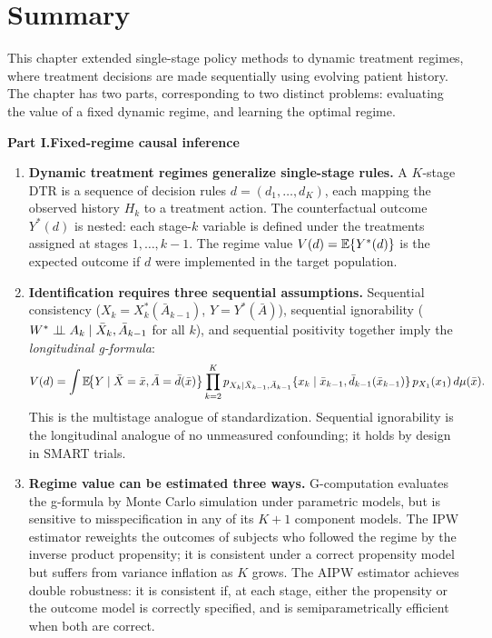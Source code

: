 \documentclass[master.tex]{subfiles}
\begin{document}
\section{Summary}
\label{w15:sec:summary}

This chapter extended single-stage policy methods to dynamic treatment regimes, where treatment decisions are made sequentially using evolving patient history. The chapter has two parts, corresponding to two distinct problems: evaluating the value of a fixed dynamic regime, and learning the optimal regime.

\medskip
\noindent\textbf{Part I.\enspace Fixed-regime causal inference}
\medskip

\begin{enumerate}

  \item \textbf{Dynamic treatment regimes generalize single-stage rules.}
    A $K$-stage DTR is a sequence of decision rules
    $d = (d_1,\ldots,d_K)$, each mapping the observed history $H_k$ to a
    treatment action. The counterfactual outcome $Y^*(d)$ is nested: each
    stage-$k$ variable is defined under the treatments assigned at stages
    $1,\ldots,k-1$. The regime value $V(d) = \mathbb{E}\{Y^*(d)\}$ is the
    expected outcome if $d$ were implemented in the target population.

  \item \textbf{Identification requires three sequential assumptions.}
    Sequential consistency ($X_k = X_k^*(\bar{A}_{k-1})$, $Y = Y^*(\bar{A})$),
    sequential ignorability ($W^* \perp\!\!\!\perp A_k \mid \bar{X}_k, \bar{A}_{k-1}$
    for all $k$), and sequential positivity together imply the
    \emph{longitudinal g-formula}:
    \[
      V(d) = \int \mathbb{E}\!\bigl\{Y \mid \bar{X}=\bar{x}, \bar{A}=\bar{d}(\bar{x})\bigr\}
             \prod_{k=2}^K p_{X_k\mid\bar{X}_{k-1},\bar{A}_{k-1}}
             \{x_k \mid \bar{x}_{k-1}, \bar{d}_{k-1}(\bar{x}_{k-1})\}\,
             p_{X_1}(x_1)\,d\mu(\bar{x}).
    \]
    This is the multistage analogue of standardization.
    Sequential ignorability is the longitudinal analogue of no unmeasured
    confounding; it holds by design in SMART trials.

  \item \textbf{Regime value can be estimated three ways.}
    G-computation evaluates the g-formula by Monte Carlo simulation under
    parametric models, but is sensitive to misspecification in any of its
    $K+1$ component models.  The IPW estimator reweights the outcomes of
    subjects who followed the regime by the inverse product propensity; it
    is consistent under a correct propensity model but suffers from
    variance inflation as $K$ grows.  The AIPW estimator achieves double
    robustness: it is consistent if, at each stage, either the propensity
    or the outcome model is correctly specified, and is semiparametrically
    efficient when both are correct.

\end{enumerate}
\end{document}
